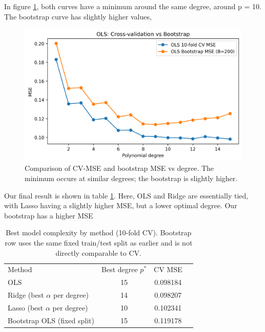 \documentclass[amssymb,twocolumn,aps,floatfix]{revtex4-2}
\begin{document}
In figure \ref{fig:CV_vs_bootstrap}, both curves have a minimum around the same degree, around p = 10. The bootstrap curve has slightly higher values,  

\begin{figure}[t]
    \centering
    \includegraphics[width=1\linewidth]{Project-1/Figures/OLS_cv_vs_bootstrap.png}
    \caption{Comparison of CV-MSE and bootstrap MSE vs degree. The minimum occurs at similar degrees; the bootstrap is slightly higher.}
    \label{fig:CV_vs_bootstrap}
\end{figure}

Our final result is shown in table \ref{tab:best-degrees-cv}. Here, OLS and Ridge are essentially tied, with Lasso having a slightly higher MSE, but a lower optimal degree. Our bootstrap has a higher MSE

\begin{table}[h!]
\caption{Best model complexity by method (10-fold CV). Bootstrap row uses the same fixed train/test split as earlier and is not directly comparable to CV.}
\label{tab:best-degrees-cv}
\begin{ruledtabular}
\begin{tabular}{lccc}
Method & Best degree $p^\ast$ & CV MSE  \\
\colrule
OLS                                & 15 & 0.098184 \\
Ridge (best $\alpha$ per degree)   & 14 & 0.098207 \\
Lasso (best $\alpha$ per degree)   & 10 & 0.102341  \\
Bootstrap OLS (fixed split)        & 15 & 0.119178 \\
\end{tabular}
\end{ruledtabular}
\end{table}
\end{document}
